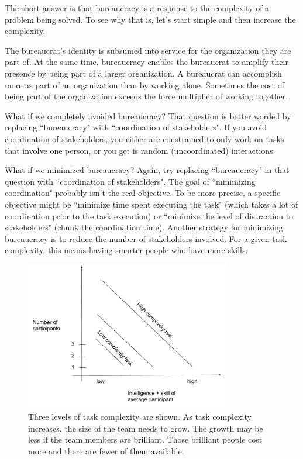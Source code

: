 The short answer is that bureaucracy is a response to the complexity of a problem being solved. To see why that is, let's start simple and then increase the complexity. 



The bureaucrat's identity is subsumed into service for the organization they are part of. At the same time, bureaucracy enables the bureaucrat to amplify their presence by being part of a larger organization. A bureaucrat can accomplish more as part of an organization than by working alone. Sometimes the cost of being part of the organization exceeds the force multiplier of working together. 


What if we completely avoided bureaucracy? That question is better worded by replacing ``bureaucracy" with ``coordination of stakeholders". If you avoid coordination of stakeholders, you either are constrained to only work on tasks that involve one person, or you get is random (uncoordinated) interactions. 

What if we minimized bureaucracy? Again, try replacing ``bureaucracy" in that question with ``coordination of stakeholders". The goal of ``minimizing coordination" probably isn't the real objective. To be more precise, a specific objective might be ``minimize time spent executing the task" (which takes a lot of coordination prior to the task execution) or ``minimize the level of distraction to stakeholders" (chunk the coordination time). Another strategy for minimizing bureaucracy is to reduce the number of stakeholders involved. For a given task complexity, this means having smarter people who have more skills. 

\begin{figure}
\includegraphics[width=0.8\textwidth]{images/people-per-task-for-skill-level.pdf}
\caption{Three levels of task complexity are shown. As task complexity increases, the size of the team needs to grow. The growth may be less if the team members are brilliant. Those brilliant people cost more and there are fewer of them available.}
\end{figure}
